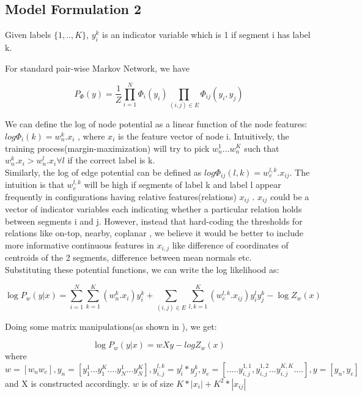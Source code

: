 \documentclass[11pt]{article} %
\begin{document}
\subsection{Model Formulation 2}
Given labels $\{1,.., K\}$, $y_i^k$ is an indicator variable which is 1 if segment i has label k. 

For standard pair-wise Markov Network, we have 

\begin{equation}
  P_\Phi (y) = \frac{1}{Z} \prod_{i=1}^{N} \Phi_i(y_i) \prod_{(i,j)\in E} \Phi_{ij}(y_i,y_j)
  \end{equation}
  
  We can define the log of node potential as a linear function of the node features:  $log \Phi_i(k) = w_n^k.x_i$ , 
where $x_i$ is the feature vector of node i. Intuitively, the training process(margin-maximization) will try to pick $w_n^1...w_n^K$ such that $w_n^k.x_i>w_n^l.x_i \forall l$ if the correct label is k.\\
  Similarly, the log of edge potential can be defined as $log \Phi_{ij}(l,k) = w_{e}^{l,k}.x_{ij}$. The intuition is that $w_{e}^{l,k}$ will be high if segments of label k and label l appear frequently in configurations having relative features(relations) $x_{ij}$ . $x_{ij}$ could be a vector of indicator variables each indicating whether a particular relation holds between segments i and j.
However, instead that hard-coding the thresholds for relations like on-top, nearby, coplanar , we believe it would be better to include more informative continuous features in $x_{i,j}$ like difference of coordinates of centroids of the 2 segments, difference between mean normals etc.\\

Substituting these potential functions, we can write the log likelihood as: 

\begin{equation}
 \log P_w (y|x) = \sum_{i=1}^{N} \sum_{k=1}^{K} (w^{k}_{n}.x_{i})y_{i}^{k} + \sum_{(i,j)\in E} \sum_{l,k=1}^{K} (w_{e}^{l,k}.x_{ij})y_i^l y_j^k   -   \log Z_w(x)
\end{equation}

Doing some matrix manipulations(as shown in \cite{taskar2004learning}), we get:

\begin{equation}
 \log P_w (y|x) = wXy -logZ_w(x)
\end{equation}
where $w=[w_n w_e], y_n=[y_1^1...y_1^K....y_N^1...y_N^K],y_{i,j}^{l,k}=y_i^l*y_j^k,y_e=[ .....y_{i,j}^{1,1},y_{i,j}^{1,2}...y_{i,j}^{K,K} ....], y=[y_n,y_e]$ and X is constructed accordingly.
$w$ is of size $K*|x_i|+K^2*|x_{ij}|$
\end{document}
